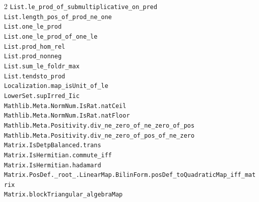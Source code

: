 \documentclass[10pt,a4paper]{article}
\begin{document}
\begin{multicols}{2}
\texttt{List.\allowbreak{}le\_prod\_of\_submultiplicative\_on\_pred} \\
\texttt{List.\allowbreak{}length\_pos\_of\_prod\_ne\_one} \\
\texttt{List.\allowbreak{}one\_le\_prod} \\
\texttt{List.\allowbreak{}one\_le\_prod\_of\_one\_le} \\
\texttt{List.\allowbreak{}prod\_hom\_rel} \\
\texttt{List.\allowbreak{}prod\_nonneg} \\
\texttt{List.\allowbreak{}sum\_le\_foldr\_max} \\
\texttt{List.\allowbreak{}tendsto\_prod} \\
\texttt{Localization.\allowbreak{}map\_isUnit\_of\_le} \\
\texttt{LowerSet.\allowbreak{}supIrred\_Iic} \\
\texttt{Mathlib.\allowbreak{}Meta.\allowbreak{}NormNum.\allowbreak{}IsRat.\allowbreak{}natCeil} \\
\texttt{Mathlib.\allowbreak{}Meta.\allowbreak{}NormNum.\allowbreak{}IsRat.\allowbreak{}natFloor} \\
\texttt{Mathlib.\allowbreak{}Meta.\allowbreak{}Positivity.\allowbreak{}div\_ne\_zero\_of\_ne\_zero\_of\_pos} \\
\texttt{Mathlib.\allowbreak{}Meta.\allowbreak{}Positivity.\allowbreak{}div\_ne\_zero\_of\_pos\_of\_ne\_zero} \\
\texttt{Matrix.\allowbreak{}IsDetpBalanced.\allowbreak{}trans} \\
\texttt{Matrix.\allowbreak{}IsHermitian.\allowbreak{}commute\_iff} \\
\texttt{Matrix.\allowbreak{}IsHermitian.\allowbreak{}hadamard} \\
\texttt{Matrix.\allowbreak{}PosDef.\allowbreak{}\_root\_.\allowbreak{}LinearMap.\allowbreak{}BilinForm.\allowbreak{}posDef\_toQuadraticMap\_iff\_matrix} \\
\texttt{Matrix.\allowbreak{}blockTriangular\_algebraMap} \\

\end{multicols}
\end{document}
